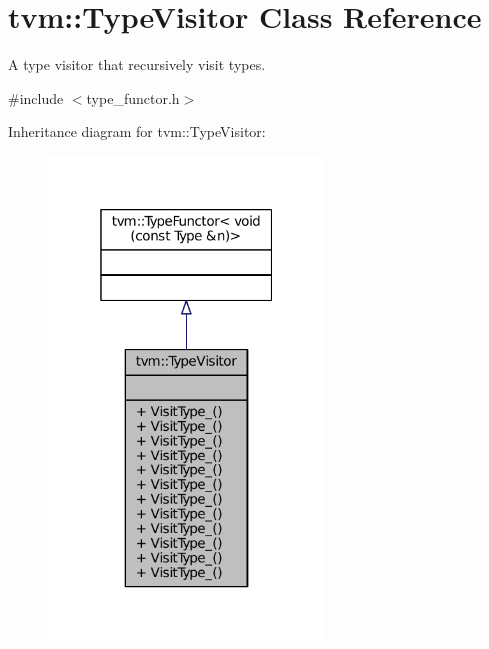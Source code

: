 \hypertarget{classtvm_1_1TypeVisitor}{}\section{tvm\+:\+:Type\+Visitor Class Reference}
\label{classtvm_1_1TypeVisitor}


A type visitor that recursively visit types.  




{\ttfamily \#include $<$type\+\_\+functor.\+h$>$}



Inheritance diagram for tvm\+:\+:Type\+Visitor\+:
\nopagebreak
\begin{figure}[H]
\begin{center}
\leavevmode
\includegraphics[width=208pt]{classtvm_1_1TypeVisitor__inherit__graph}
\end{center}
\end{figure}



